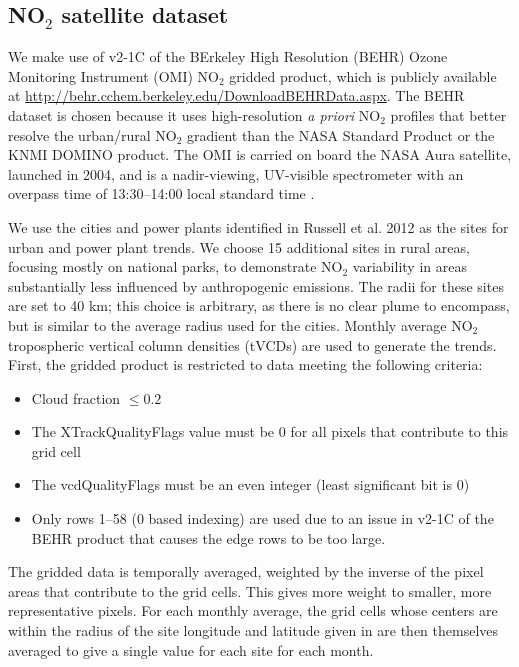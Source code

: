 \documentclass[a4paper,10pt,oneside]{article}
\newcommand{\ce}[1]{$\mathrm{#1}$}
\begin{document}
\begin{sloppy}
\subsection{NO$_2$ satellite dataset}
	We make use of v2-1C of the BErkeley High Resolution (BEHR) Ozone Monitoring Instrument (OMI) \ce{NO_2} gridded product, which is publicly available at \url{http://behr.cchem.berkeley.edu/DownloadBEHRData.aspx}. The BEHR dataset is chosen because it uses high-resolution \emph{a priori} \ce{NO_2} profiles that better resolve the urban/rural \ce{NO_2} gradient than the NASA Standard Product or the KNMI DOMINO product. The OMI is carried on board the NASA Aura satellite, launched in 2004, and is a nadir-viewing, UV-visible spectrometer with an overpass time of 13:30--14:00 local standard time \cite{levelt06}.
	
	We use the cities and power plants identified in Russell et al. 2012 \cite{russell12} as the sites for urban and power plant trends. We choose 15 additional sites in rural areas, focusing mostly on national parks, to demonstrate \ce{NO_2} variability in areas substantially less influenced by anthropogenic emissions. The radii for these sites are set to 40 km; this choice is arbitrary, as there is no clear plume to encompass, but is similar to the average radius used for the cities. Monthly average \ce{NO_2} tropospheric vertical column densities (tVCDs) are used to generate the trends. First, the gridded product is restricted to data meeting the following criteria:
	
	\begin{itemize}
	\item Cloud fraction $\leq 0.2$
	\item The XTrackQualityFlags value must be 0 for all pixels that contribute to this grid cell
	\item The vcdQualityFlags must be an even integer (least significant bit is 0)
	\item Only rows 1--58 (0 based indexing) are used due to an issue in v2-1C of the BEHR product that causes the edge rows to be too large.
	\end{itemize}
	
	The gridded data is temporally averaged, weighted by the inverse of the pixel areas that contribute to the grid cells. This gives more weight to smaller, more representative pixels.  For each monthly average, the grid cells whose centers are within the radius of the site longitude and latitude given in \cite{russell12} are then themselves averaged to give a single value for each site for each month.


\end{sloppy}
\end{document}
